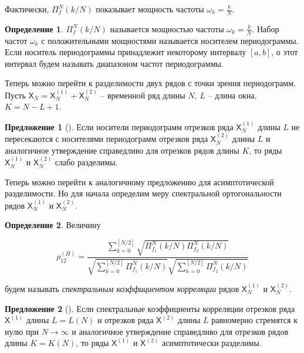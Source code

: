 \documentclass[12pt, specialist, subf
]{disser}
\theoremstyle{definition}
\newcommand{\TS}{\mathsf{X}}
\newtheorem{definition}{Определение} %
\newtheorem{proposition}{Предложение}
\begin{document}
Фактически, $\Pi_f^N(k/N)$ показывает мощность частоты $\omega_k = \frac{k}{N}$.

\begin{definition}
	$\Pi_f^N(k/N)$ называется мощностью частоты $\omega_k = \frac{k}{N}$. Набор частот $\omega_k$ с положительными мощностями называется носителем периодограммы. Если носитель периодограммы принадлежит некоторому интервалу $\left[a, b\right]$, о этот интервал будем называть диапазоном частот периодограммы.
\end{definition}


Теперь можно перейти к разделимости двух рядов с точки зрения периодограмм.
Пусть $\TS_N = \TS_N^{(1)} + \TS_N^{(2)}$ -- временной ряд длины $N$, $L$ -- длина окна, $K = N-L + 1$.

\begin{proposition}[{\cite[Глава~1, Раздел~1.4]{golyandina2001analysis}}]
	\label{prop:tochn_razd}
	Если носители периодограмм отрезков ряда \( \TS_N^{(1)} \) длины \( L \) не пересекаются с носителями периодограмм отрезков ряда \( \TS_N^{(2)} \) длины \( L \) и аналогичное утверждение справедливо для отрезков рядов длины \( K \), то ряды \( \TS_N^{(1)} \) и \( \TS_N^{(2)} \) слабо разделимы.
\end{proposition}

Теперь можно перейти к аналогичному предложению для асимптотической разделимости. Но для начала определим меру спектральной ортогональности рядов $\TS_N^{(1)}$ и $\TS_N^{(2)}$.

\begin{definition}
	Величину

\[
\rho_{12}^{(\Pi)} {=} \frac{ \sum_{k=0}^{[N/2]} \sqrt{\Pi_{f_1}^N (k/N) \Pi_{f_2}^N (k/N)}}{\sqrt{\sum_{k=0}^{[N/2]} \Pi_{f_1}^N (k/N)} \sqrt{\sum_{k=0}^{[N/2]} \Pi_{f_2}^N (k/N)}} \tag{13}
\]

будем называть \emph{спектральным коэффициентом корреляции} рядов \( \TS_N^{(1)} \) и \( \TS_N^{(2)} \).
\end{definition}

\begin{proposition}[{\cite[Глава~1, Раздел~1.4]{golyandina2001analysis}}]
	\label{prop:ass_razd}
	Если спектральные коэффициенты корреляции отрезков ряда \( \TS^{(1)} \) длины \( L = L(N) \) и отрезков ряда \( \TS^{(2)} \) длины \( L \) равномерно стремятся к нулю при \( N \to \infty \) и аналогичное утверждение справедливо для отрезков рядов длины \( K = K(N) \), то ряды \( \TS^{(1)} \) и \( \TS^{(2)} \) асимптотически разделимы.
\end{proposition}
\end{document}
